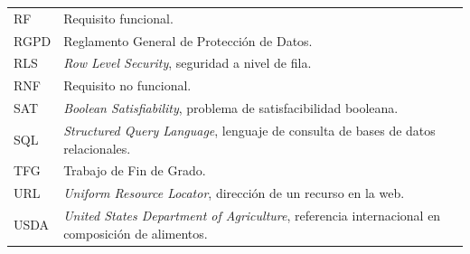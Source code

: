 \begin{tabular}{@{}p{2.3cm}p{11.4cm}@{}}
RF & Requisito funcional. \\
RGPD & Reglamento General de Protección de Datos. \\
RLS & \textit{Row Level Security}, seguridad a nivel de fila. \\
RNF & Requisito no funcional. \\
SAT & \textit{Boolean Satisfiability}, problema de satisfacibilidad booleana. \\
SQL & \textit{Structured Query Language}, lenguaje de consulta de bases de datos relacionales. \\
TFG & Trabajo de Fin de Grado. \\
URL & \textit{Uniform Resource Locator}, dirección de un recurso en la web. \\
USDA & \textit{United States Department of Agriculture}, referencia internacional en composición de alimentos. \\
\end{tabular}
\renewcommand{\arraystretch}{1}

\newpage
